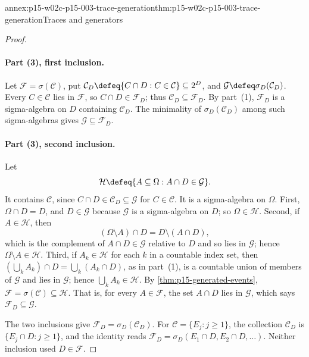 \begin{annexitem}{annex:p15-w02c-p15-003-trace-generation}{thm:p15-w02c-p15-003-trace-generation}{Traces and generators}
\begin{proof}
\paragraph{Part (3), first inclusion.}
Let \(\mathcal F=\sigma(\mathcal C)\), put
\(\mathcal C_D\defeq\{C\cap D:C\in\mathcal C\}\subseteq2^D\), and
\(\mathcal G\defeq\sigma_D(\mathcal C_D)\). Every \(C\in\mathcal C\)
lies in \(\mathcal F\), so \(C\cap D\in\mathcal F_D\); thus
\(\mathcal C_D\subseteq\mathcal F_D\). By part~(1), \(\mathcal F_D\) is a
sigma-algebra on \(D\) containing \(\mathcal C_D\). The minimality of
\(\sigma_D(\mathcal C_D)\) among such sigma-algebras gives
\(\mathcal G\subseteq\mathcal F_D\).

\paragraph{Part (3), second inclusion.}
Let
\[
 \mathcal H\defeq\{A\subseteq\Omega:A\cap D\in\mathcal G\}.
\]
It contains \(\mathcal C\), since \(C\cap D\in\mathcal C_D\subseteq\mathcal G\)
for \(C\in\mathcal C\). It is a sigma-algebra on \(\Omega\). First,
\(\Omega\cap D=D\), and \(D\in\mathcal G\) because \(\mathcal G\) is a
sigma-algebra on \(D\); so \(\Omega\in\mathcal H\). Second, if
\(A\in\mathcal H\), then
\[
 (\Omega\setminus A)\cap D=D\setminus(A\cap D),
\]
which is the complement of \(A\cap D\in\mathcal G\) relative to \(D\) and so
lies in \(\mathcal G\); hence \(\Omega\setminus A\in\mathcal H\). Third, if
\(A_k\in\mathcal H\) for each \(k\) in a countable index set, then
\((\bigcup_kA_k)\cap D=\bigcup_k(A_k\cap D)\), as in part~(1), is a
countable union of members of \(\mathcal G\) and lies in \(\mathcal G\);
hence \(\bigcup_kA_k\in\mathcal H\). By \cref{thm:p15-generated-events},
\(\mathcal F=\sigma(\mathcal C)\subseteq\mathcal H\). That is, for every
\(A\in\mathcal F\), the set \(A\cap D\) lies in \(\mathcal G\), which says
\(\mathcal F_D\subseteq\mathcal G\).

The two inclusions give \(\mathcal F_D=\sigma_D(\mathcal C_D)\). For
\(\mathcal C=\{E_j:j\geq1\}\), the collection \(\mathcal C_D\) is
\(\{E_j\cap D:j\geq1\}\), and the identity reads
\(\mathcal F_D=\sigma_D(E_1\cap D,E_2\cap D,\ldots)\). Neither inclusion
used \(D\in\mathcal F\).


\end{proof}
\end{annexitem}

